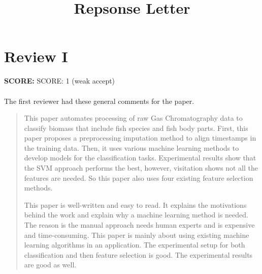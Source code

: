 \documentclass[runningheads]{llncs}
\begin{document}
%
\title{Repsonse Letter}
%
%
%

%
\maketitle              %
%
\begin{abstract}
    
  \keywords{

  }
\end{abstract}

\section{Review I}

\textbf{SCORE:} SCORE: 1 (weak accept)
\\\\
The first reviewer had these general comments for the paper. 

\begin{quote}
  This paper automates processing of raw Gas Chromatography data to classify biomass that include fish species and fish body parts. First, this paper proposes a preprocessing imputation method to align timestamps in the training data. Then, it uses various machine learning methods to develop models for the classification tasks. Experimental results show that the SVM approach performs the best, however, visitation shows not all the features are needed. So this paper also uses four existing feature selection methods.

  This paper is well-written and easy to read. It explains the motivations behind the work and explain why a machine learning method is needed. The reason is the manual approach needs human experts and is expensive and time-consuming. This paper is mainly about using existing machine learning algorithms in an application. The experimental setup for both classification and then feature selection is good. The experimental results are good as well.
\end{quote}
\end{document}
